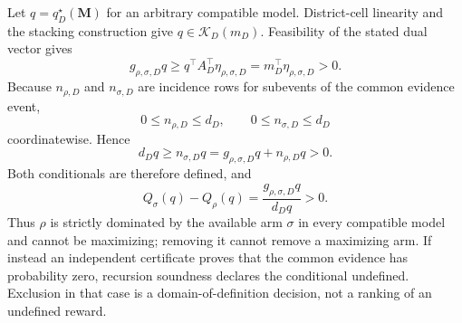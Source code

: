 Let \(q=q_D^\star(\mathbf M)\) for an arbitrary compatible model.  District-cell linearity and the stacking construction give \(q\in\mathcal K_D(m_D)\).  Feasibility of the stated dual vector gives
\[
g_{\rho,\sigma,D}q
\geq q^\top A_D^\top\eta_{\rho,\sigma,D}
=m_D^\top\eta_{\rho,\sigma,D}>0.
\]
Because \(n_{\rho,D}\) and \(n_{\sigma,D}\) are incidence rows for subevents of the common evidence event,
\[
0\leq n_{\rho,D}\leq d_D,
\qquad
0\leq n_{\sigma,D}\leq d_D
\]
coordinatewise.  Hence
\[
d_Dq\geq n_{\sigma,D}q
=g_{\rho,\sigma,D}q+n_{\rho,D}q>0.
\]
Both conditionals are therefore defined, and
\[
Q_\sigma(q)-Q_\rho(q)=\frac{g_{\rho,\sigma,D}q}{d_Dq}>0.
\]
Thus \(\rho\) is strictly dominated by the available arm \(\sigma\) in every compatible model and cannot be maximizing; removing it cannot remove a maximizing arm.  If instead an independent certificate proves that the common evidence has probability zero, recursion soundness declares the conditional undefined.  Exclusion in that case is a domain-of-definition decision, not a ranking of an undefined reward.